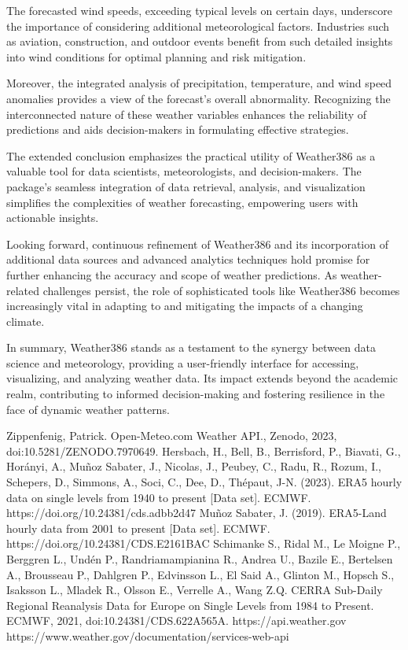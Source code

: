 \documentclass[conference]{IEEEtran}
\begin{document}
    The forecasted wind speeds, exceeding typical levels on certain days, underscore the importance of considering additional meteorological factors. Industries such as aviation, construction, and outdoor events benefit from such detailed insights into wind conditions for optimal planning and risk mitigation.

    Moreover, the integrated analysis of precipitation, temperature, and wind speed anomalies provides a view of the forecast's overall abnormality. Recognizing the interconnected nature of these weather variables enhances the reliability of predictions and aids decision-makers in formulating effective strategies.

    The extended conclusion emphasizes the practical utility of Weather386 as a valuable tool for data scientists, meteorologists, and decision-makers. The package's seamless integration of data retrieval, analysis, and visualization simplifies the complexities of weather forecasting, empowering users with actionable insights.

    Looking forward, continuous refinement of Weather386 and its incorporation of additional data sources and advanced analytics techniques hold promise for further enhancing the accuracy and scope of weather predictions. As weather-related challenges persist, the role of sophisticated tools like Weather386 becomes increasingly vital in adapting to and mitigating the impacts of a changing climate.

    In summary, Weather386 stands as a testament to the synergy between data science and meteorology, providing a user-friendly interface for accessing, visualizing, and analyzing weather data. Its impact extends beyond the academic realm, contributing to informed decision-making and fostering resilience in the face of dynamic weather patterns.



\begin{thebibliography}{00}
 Zippenfenig, Patrick. Open-Meteo.com Weather API., Zenodo, 2023, doi:10.5281/ZENODO.7970649.
 Hersbach, H., Bell, B., Berrisford, P., Biavati, G., Horányi, A., Muñoz Sabater, J., Nicolas, J., Peubey, C., Radu, R., Rozum, I., Schepers, D., Simmons, A., Soci, C., Dee, D., Thépaut, J-N. (2023). ERA5 hourly data on single levels from 1940 to present [Data set]. ECMWF. https://doi.org/10.24381/cds.adbb2d47
 Muñoz Sabater, J. (2019). ERA5-Land hourly data from 2001 to present [Data set]. ECMWF. https://doi.org/10.24381/CDS.E2161BAC
 Schimanke S., Ridal M., Le Moigne P., Berggren L., Undén P., Randriamampianina R., Andrea U., Bazile E., Bertelsen A., Brousseau P., Dahlgren P., Edvinsson L., El Said A., Glinton M., Hopsch S., Isaksson L., Mladek R., Olsson E., Verrelle A., Wang Z.Q. CERRA Sub-Daily Regional Reanalysis Data for Europe on Single Levels from 1984 to Present. ECMWF, 2021, doi:10.24381/CDS.622A565A.
 https://api.weather.gov https://www.weather.gov/documentation/services-web-api
\end{thebibliography}
\end{document}
